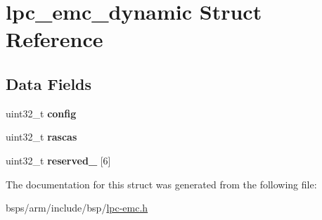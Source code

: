 \hypertarget{structlpc__emc__dynamic}{}\section{lpc\+\_\+emc\+\_\+dynamic Struct Reference}
\label{structlpc__emc__dynamic}
\subsection*{Data Fields}
\begin{DoxyCompactItemize}
\item 
\mbox{\label{structlpc__emc__dynamic_a18236c46330bf37f9fc0ca15f68a5e64}} 
uint32\+\_\+t {\bfseries config}
\item 
\mbox{\label{structlpc__emc__dynamic_a14863bd4239eb161b13cec61c8a97c32}} 
uint32\+\_\+t {\bfseries rascas}
\item 
\mbox{\label{structlpc__emc__dynamic_a76a6e38cf6dbd53c13028c5dc0621104}} 
uint32\+\_\+t {\bfseries reserved\+\_} \mbox{[}6\mbox{]}
\end{DoxyCompactItemize}


The documentation for this struct was generated from the following file\+:\begin{DoxyCompactItemize}
\item 
bsps/arm/include/bsp/\mbox{\hyperlink{lpc-emc_8h}{lpc-\/emc.\+h}}\end{DoxyCompactItemize}
